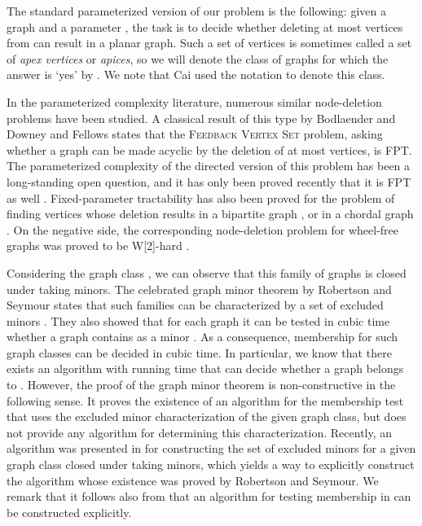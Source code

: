 \documentclass{llncs}
\begin{document}
The standard parameterized version of our problem is the
following: given a graph  and a parameter , the task is to
decide whether deleting at most  vertices from  can result in a planar graph.
Such a set of vertices is sometimes called a set of \emph{apex vertices} or \emph{apices},
so we will denote the class of graphs for which the answer is `yes' by .
We note that Cai \cite{cai96} used the notation  to denote this class.

In the parameterized complexity literature, numerous similar node-deletion problems have been studied.
A classical result of this type by Bodlaender \cite{bod94} and Downey and Fellows \cite{dow92} states that
the \textsc{Feedback Vertex Set} problem, asking whether a graph can be made acyclic by the deletion of at most  vertices,
is FPT. The parameterized complexity of the directed version of this problem has been a long-standing open question,
and it has only been proved recently that it is FPT as well \cite{che07}.
Fixed-parameter tractability has also been proved for the problem of finding  vertices whose deletion results
in a bipartite graph \cite{ree04}, or in a chordal graph \cite{marxx}.
On the negative side, the corresponding node-deletion problem for wheel-free graphs was proved to be W[2]-hard \cite{lok08}.

Considering the graph class ,
we can observe that this family of graphs is closed under taking minors.
The celebrated graph minor theorem by Robertson and Seymour states that such families can be characterized by
a set of excluded minors \cite{sey04}. They also showed that for each graph  it can be tested in cubic time whether
a graph contains  as a minor \cite{sey95}. As a consequence, membership for such graph classes can be decided in cubic time.
In particular, we know that there exists an algorithm with running time  that
can decide whether a graph belongs to .
However, the proof of the graph minor theorem is non-constructive in the following sense.
It proves the existence of an algorithm for the membership test that uses the excluded minor
characterization of the given graph class, but does not provide any algorithm for determining this characterization.
Recently, an algorithm was presented in \cite{adl08} for constructing the set of excluded minors
for a given graph class closed under taking minors,
which yields a way to explicitly construct the algorithm whose existence was proved by Robertson and Seymour.
We remark that it follows also from \cite{fel89} that an algorithm for testing membership in
 can be constructed explicitly.
\end{document}
